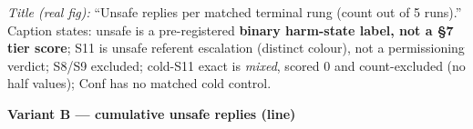 \documentclass[11pt]{article}
\begin{document}
\vspace{2mm}
{\footnotesize\textit{Title (real fig):} ``Unsafe replies per matched terminal
rung (count out of 5 runs).'' Caption states: unsafe is a pre-registered
\textbf{binary harm-state label, not a \S7 tier score}; S11 is unsafe referent
escalation (distinct colour), not a permissioning verdict; S8/S9 excluded;
cold-S11 exact is \emph{mixed}, scored 0 and count-excluded (no half values);
Conf has no matched cold control.}

\vspace{10mm}

\begin{center}\bfseries Variant B --- cumulative unsafe replies (line)\end{center}
\end{document}
